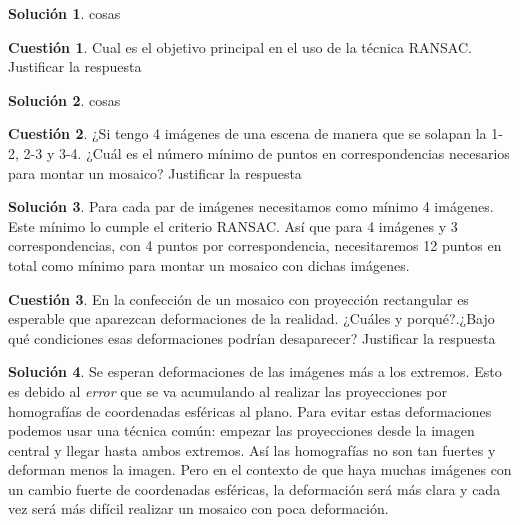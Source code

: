 \documentclass[a4paper, 11pt]{article}
\theoremstyle{definition}
\newtheorem{cuestion}{Cuestión}
\newtheorem*{solucion}{Solución}
\begin{document}
  \begin{solucion}
     	cosas
  \end{solucion}

  \begin{cuestion}
    Cual es el objetivo principal en el uso de la técnica RANSAC. Justificar
    la respuesta
  \end{cuestion}

  \begin{solucion}
     	cosas
  \end{solucion}
  \begin{cuestion}
    ¿Si tengo 4 imágenes de una escena de manera que se solapan la 1-2, 2-3
    y 3-4. ¿Cuál es el número mínimo de puntos en correspondencias necesarios para
    montar un mosaico? Justificar la respuesta
  \end{cuestion}

  \begin{solucion}
     	Para cada par de imágenes necesitamos como mínimo 4 imágenes. Este mínimo lo
      cumple el criterio RANSAC. Así que para 4 imágenes y 3 correspondencias, con
      4 puntos por correspondencia, necesitaremos 12 puntos en total como mínimo
      para montar un mosaico con dichas imágenes.
  \end{solucion}

  \begin{cuestion}
    En la confección de un mosaico con proyección rectangular es esperable
   que aparezcan deformaciones de la realidad. ¿Cuáles y porqué?.¿Bajo qué
   condiciones esas deformaciones podrían desaparecer? Justificar la respuesta

  \end{cuestion}

  \begin{solucion}
    Se esperan deformaciones de las imágenes más a los extremos. Esto es debido al
    \textit{error} que se va acumulando al realizar las proyecciones por homografías
    de coordenadas esféricas al plano. Para evitar estas deformaciones podemos usar
    una técnica común: empezar las proyecciones desde la imagen central y llegar
    hasta ambos extremos. Así las homografías no son tan fuertes y deforman menos la imagen.
    Pero en el contexto de que haya muchas imágenes con un cambio fuerte de coordenadas
    esféricas, la deformación será más clara y cada vez será más difícil realizar
    un mosaico con poca deformación.
  \end{solucion}
\end{document}
